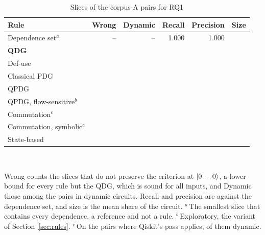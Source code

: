 \begin{table}[t]
  \centering
  \caption{Slices of the \numNPairs{} corpus-A pairs for RQ1}
  \label{tab:rq1}
  \footnotesize\setlength{\tabcolsep}{3pt}\renewcommand{\arraystretch}{1.12}
  \newcommand{\sep}{\arrayrulecolor{black!25}\hline\arrayrulecolor{black}}
  \begin{tabular}{@{}l r r r r r@{}}
    \toprule
    \textbf{Rule} & \textbf{Wrong} & \textbf{Dynamic} & \textbf{Recall} & \textbf{Precision} & \textbf{Size} \\
    \midrule
    Dependence set$^{a}$ & -- & -- & 1.000 & 1.000 & \numDepFloor{} \\
    \midrule
    \rowcolor{blue!7}\textbf{QDG} & \textbf{\numRqOneLcUnsound{}} & \numLcDynamicUnsound{} & \textbf{\numRqOneLcRecall{}} & \numRqOneLcPrecision{} & \numRqOneLcSize{} \\ \sep
    Def-use & \numRqOneDuUnsound{} & \numDuDynamicUnsound{} & \numRqOneDuRecall{} & \numRqOneDuPrecision{} & \numRqOneDuSize{} \\ \sep
    Classical PDG & \numCpdgUnsound{} & \numCpdgDynamicUnsound{} & \numCpdgRecall{} & \numCpdgPrecision{} & \numCpdgSize{} \\ \sep
    QPDG~\cite{yu2025qpdg} & \numRqOneYzUnsound{} & \numYzDynamicUnsound{} & \numRqOneYzRecall{} & \numRqOneYzPrecision{} & \numRqOneYzSize{} \\ \sep
    QPDG, flow-sensitive$^{b}$ & \numYzfUnsound{} & \numYzfDynamicUnsound{} & \numYzfRecall{} & \numYzfPrecision{} & \numYzfSize{} \\
    \midrule
    Commutation$^{c}$ & \numLcqUnsound{} & \numLcqDynamicUnsound{} & \numLcqRecall{} & \numLcqPrecision{} & \numLcqSize{} \\ \sep
    Commutation, symbolic$^{c}$ & \numLcqsUnsound{} & \numLcqsDynamicUnsound{} & \numLcqsRecall{} & \numLcqsPrecision{} & \numLcqsSize{} \\ \sep
    State-based & \numRqOneQUnsound{} & \numQDynamicUnsound{} & \numRqOneQRecall{} & \numRqOneQPrecision{} & \numRqOneQSize{} \\
    \bottomrule
  \end{tabular}\\[3pt]
  \begin{minipage}{\columnwidth}\footnotesize
  Wrong counts the slices that do not preserve the criterion at $\lvert 0\dots0\rangle$, a lower bound for every rule but the
  QDG, which is sound for all inputs, and Dynamic those among the \numNDynamicPairs{} pairs in dynamic circuits.
  Recall and precision are against the dependence set, and size is the mean share of the circuit. $^{a}$\,The
  smallest slice that contains every dependence, a reference and not a rule. $^{b}$\,Exploratory, the variant of
  Section~\ref{sec:rules}. $^{c}$\,On the \numLcqApplicable{} pairs where Qiskit's pass
  applies, \numLcqDynamicN{} of them dynamic.
  \end{minipage}
\end{table}

